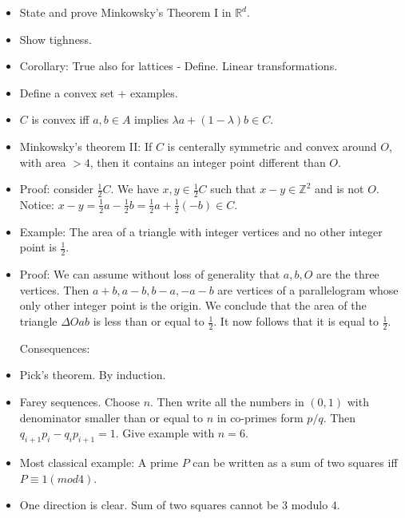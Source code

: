 \documentclass[12pt]{article}
\begin{document}
\begin{itemize}

\item State and prove Minkowsky's Theorem I in $\mathbb{R}^d$.

\item Show tighness.

\item Corollary: True also for lattices - Define. Linear transformations.

\item Define a convex set + examples.
\item $C$ is convex iff $a,b \in A$ implies
$\lambda a +(1-\lambda)b \in C$.

\item Minkowsky's theorem II: If $C$ is centerally symmetric and convex around $O$, with area $>4$, then it contains an integer point different than $O$.

\item Proof: consider $\frac{1}{2}C$.
We have $x, y \in \frac{1}{2}C$ such that 
$x-y \in \mathbb{Z}^2$ and is not $O$.
Notice: $x-y=\frac{1}{2}a-\frac{1}{2}b=
\frac{1}{2}a+\frac{1}{2}(-b) \in C$.

\item Example: The area of a triangle with integer vertices and no other integer point is 
$\frac{1}{2}$.

\item Proof: We can assume without loss of generality that $a,b,O$ are the three vertices. Then $a+b,a-b,b-a,-a-b$ are vertices of a parallelogram whose only other integer point is
the origin. We conclude that the area of the triangle $\Delta Oab$ is less than or equal to $\frac{1}{2}$. It now follows that it is equal to $\frac{1}{2}$.

Consequences:

\item Pick's theorem. By induction.

\item Farey sequences. Choose $n$.
Then write all the numbers in $(0,1)$ with denominator
smaller than or equal to $n$ in co-primes form
$p/q$.
Then $q_{i+1}p_{i}-q_{i}p_{i+1}=1$.
Give example with $n=6$.

\item Most classical example: A prime
$P$ can be written as a sum of two squares iff $P \equiv 1 (mod 4)$.

\item One direction is clear. Sum of two squares cannot be $3$ modulo $4$.


\end{itemize}
\end{document}
